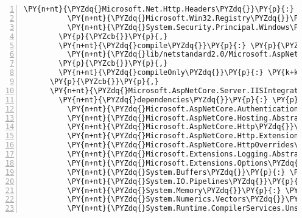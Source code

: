 \begin{Verbatim}[commandchars=\\\{\},numbers=left,firstnumber=1,stepnumber=1,numberblanklines=0]
          \PY{n+nt}{\PYZdq{}Microsoft.Net.Http.Headers\PYZdq{}}\PY{p}{:} \PY{l+s+s2}{\PYZdq{}2.1.0\PYZhy{}rc1\PYZhy{}final\PYZdq{}}\PY{p}{,}
          \PY{n+nt}{\PYZdq{}Microsoft.Win32.Registry\PYZdq{}}\PY{p}{:} \PY{l+s+s2}{\PYZdq{}4.5.0\PYZhy{}rc1\PYZdq{}}\PY{p}{,}
          \PY{n+nt}{\PYZdq{}System.Security.Principal.Windows\PYZdq{}}\PY{p}{:} \PY{l+s+s2}{\PYZdq{}4.5.0\PYZhy{}rc1\PYZdq{}}
        \PY{p}{\PYZcb{}}\PY{p}{,}
        \PY{n+nt}{\PYZdq{}compile\PYZdq{}}\PY{p}{:} \PY{p}{\PYZob{}}
          \PY{n+nt}{\PYZdq{}lib/netstandard2.0/Microsoft.AspNetCore.Server.HttpSys.dll\PYZdq{}}\PY{p}{:} \PY{p}{\PYZob{}}\PY{p}{\PYZcb{}}
        \PY{p}{\PYZcb{}}\PY{p}{,}
        \PY{n+nt}{\PYZdq{}compileOnly\PYZdq{}}\PY{p}{:} \PY{k+kc}{true}
      \PY{p}{\PYZcb{}}\PY{p}{,}
      \PY{n+nt}{\PYZdq{}Microsoft.AspNetCore.Server.IISIntegration/2.1.0\PYZhy{}rc1\PYZhy{}final\PYZdq{}}\PY{p}{:} \PY{p}{\PYZob{}}
        \PY{n+nt}{\PYZdq{}dependencies\PYZdq{}}\PY{p}{:} \PY{p}{\PYZob{}}
          \PY{n+nt}{\PYZdq{}Microsoft.AspNetCore.Authentication.Core\PYZdq{}}\PY{p}{:} \PY{l+s+s2}{\PYZdq{}2.1.0\PYZhy{}rc1\PYZhy{}final\PYZdq{}}\PY{p}{,}
          \PY{n+nt}{\PYZdq{}Microsoft.AspNetCore.Hosting.Abstractions\PYZdq{}}\PY{p}{:} \PY{l+s+s2}{\PYZdq{}2.1.0\PYZhy{}rc1\PYZhy{}final\PYZdq{}}\PY{p}{,}
          \PY{n+nt}{\PYZdq{}Microsoft.AspNetCore.Http\PYZdq{}}\PY{p}{:} \PY{l+s+s2}{\PYZdq{}2.1.0\PYZhy{}rc1\PYZhy{}final\PYZdq{}}\PY{p}{,}
          \PY{n+nt}{\PYZdq{}Microsoft.AspNetCore.Http.Extensions\PYZdq{}}\PY{p}{:} \PY{l+s+s2}{\PYZdq{}2.1.0\PYZhy{}rc1\PYZhy{}final\PYZdq{}}\PY{p}{,}
          \PY{n+nt}{\PYZdq{}Microsoft.AspNetCore.HttpOverrides\PYZdq{}}\PY{p}{:} \PY{l+s+s2}{\PYZdq{}2.1.0\PYZhy{}rc1\PYZhy{}final\PYZdq{}}\PY{p}{,}
          \PY{n+nt}{\PYZdq{}Microsoft.Extensions.Logging.Abstractions\PYZdq{}}\PY{p}{:} \PY{l+s+s2}{\PYZdq{}2.1.0\PYZhy{}rc1\PYZhy{}final\PYZdq{}}\PY{p}{,}
          \PY{n+nt}{\PYZdq{}Microsoft.Extensions.Options\PYZdq{}}\PY{p}{:} \PY{l+s+s2}{\PYZdq{}2.1.0\PYZhy{}rc1\PYZhy{}final\PYZdq{}}\PY{p}{,}
          \PY{n+nt}{\PYZdq{}System.Buffers\PYZdq{}}\PY{p}{:} \PY{l+s+s2}{\PYZdq{}4.5.0\PYZhy{}rc1\PYZdq{}}\PY{p}{,}
          \PY{n+nt}{\PYZdq{}System.IO.Pipelines\PYZdq{}}\PY{p}{:} \PY{l+s+s2}{\PYZdq{}4.5.0\PYZhy{}rc1\PYZdq{}}\PY{p}{,}
          \PY{n+nt}{\PYZdq{}System.Memory\PYZdq{}}\PY{p}{:} \PY{l+s+s2}{\PYZdq{}4.5.0\PYZhy{}rc1\PYZdq{}}\PY{p}{,}
          \PY{n+nt}{\PYZdq{}System.Numerics.Vectors\PYZdq{}}\PY{p}{:} \PY{l+s+s2}{\PYZdq{}4.5.0\PYZhy{}rc1\PYZdq{}}\PY{p}{,}
          \PY{n+nt}{\PYZdq{}System.Runtime.CompilerServices.Unsafe\PYZdq{}}\PY{p}{:} \PY{l+s+s2}{\PYZdq{}4.5.0\PYZhy{}rc1\PYZdq{}}\PY{p}{,}

\end{Verbatim}
